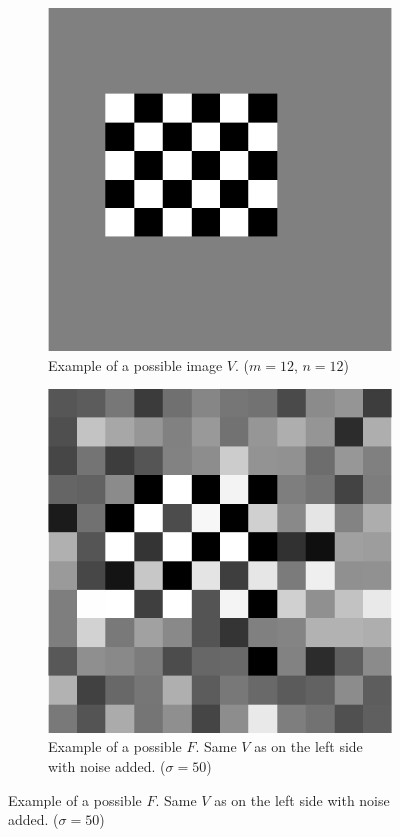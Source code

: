 \documentclass[presentation]{beamer}
\begin{document}
\begin{frame}
	\begin{figure}
		\centering
		\begin{subfigure}[t]{0.45\linewidth}
			\centering
			\includegraphics[width=0.9\linewidth]{Thresholding/exampleV}
			\caption{Example of a possible image $V$. ($m = 12$, $n = 12$)}
		\end{subfigure}
		\hfill
		\begin{subfigure}[t]{0.45\linewidth}
			\centering
			\includegraphics[width=0.9\linewidth]{Thresholding/exampleFsigma50}
			\caption{Example of a possible $F$. Same $V$ as on the left side with noise added. ($\sigma = 50$)}
		\end{subfigure}
	\end{figure}
\end{frame}
\end{document}
